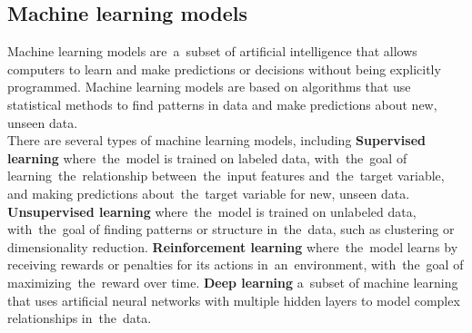 \subsection{Machine learning models}\label{sec:ml}
Machine learning models are~a~subset of artificial intelligence that allows computers to learn and make
predictions or decisions without being explicitly programmed. Machine learning models are based on algorithms
that use statistical methods to find patterns in data and make predictions about new, unseen data.
\\
There are several types of machine learning models, including \textbf{Supervised learning} where~the~model is trained on labeled data, with~the~goal of learning~the~relationship between~the~input features and~the~target variable, and making predictions about~the~target variable for new, unseen data.
\textbf{Unsupervised learning} where~the~model is trained on unlabeled data, with~the~goal of finding patterns or structure in~the~data, such as clustering or dimensionality reduction. \textbf{Reinforcement learning} where~the~model learns by receiving rewards or penalties for its actions in~an~environment, with~the~goal of maximizing~the~reward over time. \textbf{Deep learning} a~subset of machine learning that uses artificial neural networks with multiple hidden layers to model complex relationships in~the~data. 

